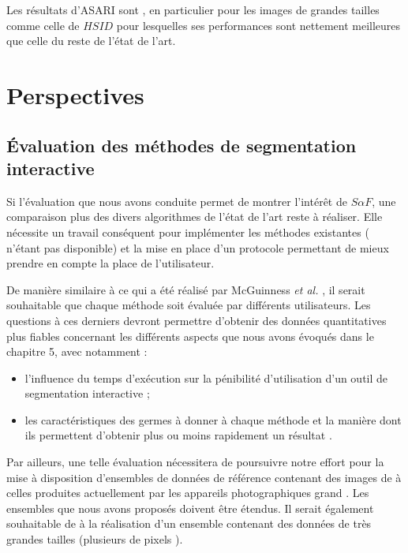 Les résultats d'ASARI sont , en particulier pour les images de grandes tailles comme celle de $HSID$ pour lesquelles ses performances sont nettement meilleures que celle du reste de l'état de l'art.


\section{Perspectives}


\subsection{Évaluation des méthodes de segmentation interactive}

Si l'évaluation que nous avons conduite permet de montrer l'intérêt de $S \alpha F$, une comparaison plus  des divers algorithmes de l'état de l'art reste à réaliser. Elle nécessite un travail conséquent pour implémenter les méthodes existantes ( n'étant pas disponible) et la mise en place d'un protocole permettant de mieux prendre en compte la place de l'utilisateur. 

De manière similaire à ce qui a été réalisé par McGuinness \textit{et al.} \cite{mcguinness2010comparative}, il serait souhaitable que chaque méthode soit évaluée par différents utilisateurs. Les questions  à ces derniers devront permettre d'obtenir des données quantitatives plus fiables concernant les différents aspects que nous avons évoqués dans le chapitre 5, avec notamment :

\begin{itemize}
\item l'influence du temps d'exécution sur la pénibilité d'utilisation d'un outil de segmentation interactive ;
\item les caractéristiques des germes à donner à chaque méthode et la manière dont ils permettent d'obtenir plus ou moins rapidement un résultat . 
\end{itemize}

Par ailleurs, une telle évaluation nécessitera de poursuivre notre effort pour la mise à disposition d'ensembles de données de référence contenant des images de  à celles produites actuellement par les appareils photographiques grand . Les ensembles que nous avons proposés doivent être étendus. Il serait également souhaitable de  à la réalisation d'un ensemble contenant des données de très grandes tailles (plusieurs  de pixels ).

